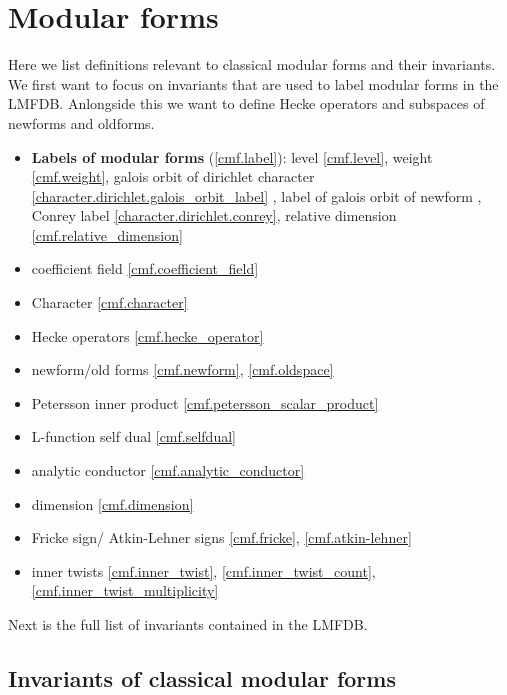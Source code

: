
\chapter{Modular forms}

Here we list definitions relevant to classical modular forms and their invariants. We first want to
focus on invariants that are used to label modular forms in the LMFDB. Anlongside this we want to
define Hecke operators and subspaces of newforms and oldforms.


\begin{itemize}
    \item \textbf{Labels of modular forms} (\ref{cmf.label}): level \ref{cmf.level}, weight \ref{cmf.weight},
    galois orbit of dirichlet character \ref{character.dirichlet.galois_orbit_label} , label of galois orbit of newform \label{cmf.galois_orbit}, Conrey label \ref{character.dirichlet.conrey}, relative dimension \ref{cmf.relative_dimension}
    \item coefficient field \ref{cmf.coefficient_field}
    \item Character \ref{cmf.character}
    \item Hecke operators \ref{cmf.hecke_operator}
    \item newform/old forms \ref{cmf.newform}, \ref{cmf.oldspace}
    \item Petersson inner product \ref{cmf.petersson_scalar_product}
    \item L-function self dual \ref{cmf.selfdual}
    \item analytic conductor \ref{cmf.analytic_conductor}
    \item dimension \ref{cmf.dimension}
    \item Fricke sign/ Atkin-Lehner signs \ref{cmf.fricke}, \ref{cmf.atkin-lehner}
    \item inner twists \ref{cmf.inner_twist}, \ref{cmf.inner_twist_count}, \ref{cmf.inner_twist_multiplicity}
\end{itemize}

Next is the full list of invariants contained in the LMFDB.


\section{Invariants of classical modular forms}

